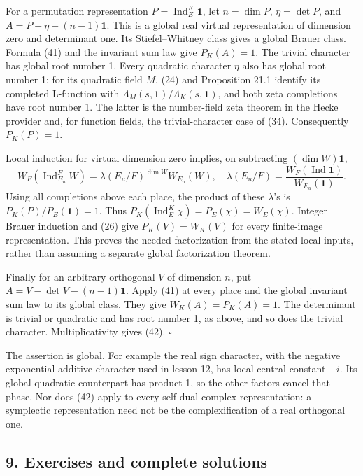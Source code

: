 \documentclass[11pt,a4paper]{article}
\begin{document}
For a permutation representation \(P=\operatorname{Ind}_E^K\mathbf1\),
let \(n=\dim P\), \(\eta=\det P\), and \(A=P-\eta-(n-1)\mathbf1\). This
is a global real virtual representation of dimension zero and
determinant one. Its Stiefel--Whitney class gives a global Brauer class.
Formula (41) and the invariant sum law give \(P_K(A)=1\). The trivial
character has global root number 1. Every quadratic character \(\eta\)
also has global root number 1: for its quadratic field \(M\), (24) and
Proposition 21.1 identify its completed L-function with
\(\Lambda_M(s,\mathbf1)/\Lambda_K(s,\mathbf1)\), and both zeta
completions have root number 1. The latter is the number-field zeta
theorem in the Hecke provider and, for function fields, the
trivial-character case of (34). Consequently \(P_K(P)=1\).

Local induction for virtual dimension zero implies, on subtracting
\((\dim W)\mathbf1\), \[
W_F(\operatorname{Ind}_{E_u}^F W)
=\lambda(E_u/F)^{\dim W}W_{E_u}(W),\quad
\lambda(E_u/F)=\frac{W_F(\operatorname{Ind}\mathbf1)}{W_{E_u}(\mathbf1)}.
\tag{43}
\] Using all completions above each place, the product of these
\(\lambda\)'s is \(P_K(P)/P_E(\mathbf1)=1\). Thus
\(P_K(\operatorname{Ind}_E^K\chi)=P_E(\chi)=W_E(\chi)\). Integer Brauer
induction and (26) give \(P_K(V)=W_K(V)\) for every finite-image
representation. This proves the needed factorization from the stated
local inputs, rather than assuming a separate global factorization
theorem.

Finally for an arbitrary orthogonal \(V\) of dimension \(n\), put
\(A=V-\det V-(n-1)\mathbf1\). Apply (41) at every place and the global
invariant sum law to its global class. They give \(W_K(A)=P_K(A)=1\).
The determinant is trivial or quadratic and has root number 1, as above,
and so does the trivial character. Multiplicativity gives (42).
\(\square\)

The assertion is global. For example the real sign character, with the
negative exponential additive character used in lesson 12, has local
central constant \(-i\). Its global quadratic counterpart has product 1,
so the other factors cancel that phase. Nor does (42) apply to every
self-dual complex representation: a symplectic representation need not
be the complexification of a real orthogonal one.

\subsection{9. Exercises and complete
solutions}\label{exercises-and-complete-solutions}
\end{document}
